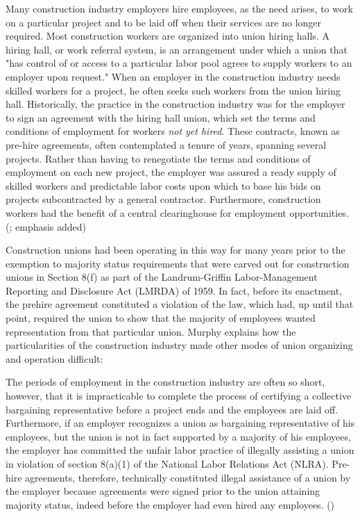 \documentclass[12pt]{article}
\renewenvironment{quote}
  {\list{}{\leftmargin=\parindent\rightmargin=0pt}%
   \item\relax}
  {\endlist}
\begin{document}
\begin{quote}
Many construction industry employers hire employees, as the need arises, to work on a particular project and to be laid off when their services are no longer required. Most construction workers are organized into union hiring halls. A hiring hall, or work referral system, is an arrangement under which a union that "has control of or access to a particular labor pool agrees to supply workers to an employer upon request." When an employer in the construction industry needs skilled workers for a project, he often seeks such workers from the union hiring hall. Historically, the practice in the construction industry was for the employer to sign an agreement with the hiring hall union, which set the terms and conditions of employment for workers \textit{not yet hired}. These contracts, known as pre-hire agreements, often contemplated a tenure of years, spanning several projects. Rather than having to renegotiate the terms and conditions of employment on each new project, the employer was assured a ready supply of skilled workers and predictable labor costs upon which to base his bids on projects subcontracted by a general contractor. Furthermore, construction workers had the benefit of a central clearinghouse for employment opportunities. (\cite[1014–15]{murphyPreHireAgreementsSection1982}; emphasis added)
\end{quote}

Construction unions had been operating in this way for many years prior to the exemption to majority status requirements that were carved out for construction unions in Section 8(f) as part of the Landrum-Griffin Labor-Management Reporting and Disclosure Act (LMRDA) of 1959. In fact, before its enactment, the prehire agreement constituted a violation of the law, which had, up until that point, required the union to show that the majority of employees wanted representation from that particular union. Murphy explains how the particularities of the construction industry made other modes of union organizing and operation difficult:

\begin{quote}
The periods of employment in the construction industry are often so short, however, that it is impracticable to complete the process of certifying a collective bargaining representative before a project ends and the employees are laid off. Furthermore, if an employer recognizes a union as bargaining representative of his employees, but the union is not in fact supported by a majority of his employees, the employer has committed the unfair labor practice of illegally assisting a union in violation of section 8(a)(1) of the National Labor Relations Act (NLRA). Pre-hire agreements, therefore, technically constituted illegal assistance of a union by the employer because agreements were signed prior to the union attaining majority status, indeed before the employer had even hired any employees. (\citeyear[1016–17]{murphyPreHireAgreementsSection1982})
\end{quote}
\end{document}

